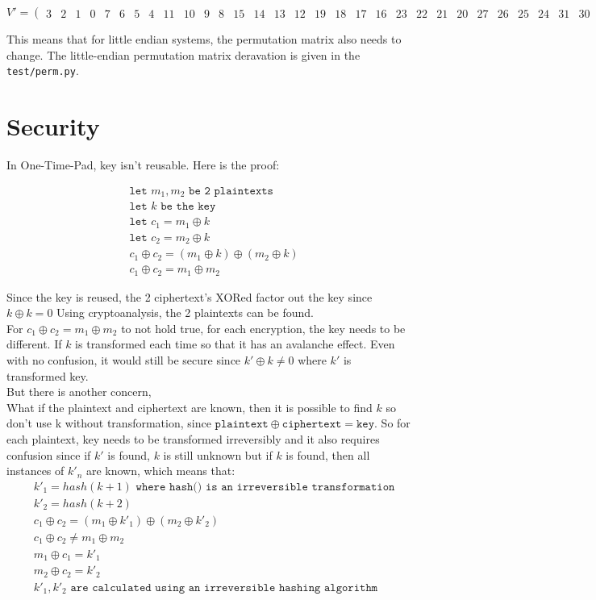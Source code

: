 \documentclass[fleqn, a4paper,12pt]{article}
\begin{document}
\[
V' = 
\begin{pmatrix}
	3 & 2 & 1 & 0 & 7 & 6 & 5 & 4 & 11 & 10 & 9 & 8 & 15 & 14 & 13 & 12 & 19 & 18 & 17 & 16 & 23 & 22 & 21 & 20 & 27 & 26 & 25 & 24 & 31 & 30 & 29 & 28
\end{pmatrix}
\]

This means that for little endian systems, the permutation matrix also needs to change. The little-endian permutation matrix deravation is given in the \texttt{test/perm.py}.

\section{Security}
\setlength{\mathindent}{3pt} %

In One-Time-Pad, key isn't reusable. Here is the proof:

\[
\begin{aligned}
&\texttt{let }  m_1, m_2 \texttt{ be 2 plaintexts} \\
&\texttt{let }  k \texttt{ be the key} \\
&\texttt{let }  c_1 = m_1 \oplus k \\
&\texttt{let }  c_2 = m_2 \oplus k \\
&c_1 \oplus c_2 = (m_1 \oplus k) \oplus (m_2 \oplus k) \\
&c_1 \oplus c_2 = m_1 \oplus m_2
\end{aligned}
\]

Since the key is reused, the 2 ciphertext's XORed factor out the key since $k \oplus k = 0$
Using cryptoanalysis, the 2 plaintexts can be found. 
\\
For $c_1 \oplus c_2 = m_1 \oplus m_2$ to not hold true, for each encryption, the key needs to be different. If $k$ is transformed each time so that it has an avalanche effect. Even with no confusion, it would still be secure since $k' \oplus k \neq  0$ where $k'$ is transformed key. 
\\
But there is another concern,
\\
What if the plaintext and ciphertext are known, then it is possible to find $k$ so don't use k without transformation, since $\texttt{plaintext} \oplus \texttt{ciphertext} = \texttt{key}$. So for each plaintext, key needs to be transformed irreversibly and it also requires confusion since if $k'$ is found, $k$ is still unknown but if $k$ is found, then all instances of $k'_n$ are known, which means that: 
\[
\begin{aligned}
&k'_1 = hash(k+1) \texttt{ where hash() is an irreversible transformation} \\
&k'_2 = hash(k+2) \\
&c_1 \oplus c_2 = (m_1 \oplus k'_1) \oplus (m_2 \oplus k'_2) \\
&c_1 \oplus c_2 \neq m_1 \oplus m_2 \\
&m_1 \oplus c_1 = k'_1 \\
&m_2 \oplus c_2 = k'_2 \\
&k'_1, k'_2 \texttt{  are calculated using an irreversible hashing algorithm }
\end{aligned}
\]
\\
\end{document}
